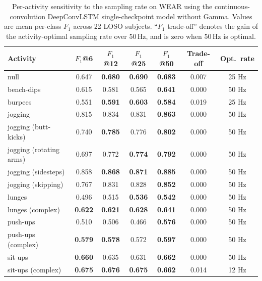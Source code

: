 \begin{table}[H]
  \centering
  \caption{Per-activity sensitivity to the sampling rate on WEAR using the continuous-convolution DeepConvLSTM single-checkpoint model without Gamma. Values are mean per-class $F_1$ across 22 LOSO subjects. ``$F_1$ trade-off'' denotes the gain of the activity-optimal sampling rate over $50$\,Hz, and is zero when $50$\,Hz is optimal.}
  \label{tab:freq_perclass_wear_continuous_single_nogamma}
  \begin{tabular}{lcccccc}
    \toprule
    Activity & $F_1$@6 & $F_1$@12 & $F_1$@25 & $F_1$@50 & Trade-off & Opt.\ rate \\
    \midrule
    null                           & 0.647 & \textbf{0.680} & \textbf{0.690} & \textbf{0.683} & 0.007 & 25 Hz \\
    bench-dips                     & 0.615 & 0.581 & 0.565 & \textbf{0.641} & 0.000 & 50 Hz \\
    burpees                        & 0.551 & \textbf{0.591} & \textbf{0.603} & \textbf{0.584} & 0.019 & 25 Hz \\
    jogging                        & 0.815 & 0.834 & 0.831 & \textbf{0.863} & 0.000 & 50 Hz \\
    jogging (butt-kicks)           & 0.740 & \textbf{0.785} & 0.776 & \textbf{0.802} & 0.000 & 50 Hz \\
    jogging (rotating arms)        & 0.697 & 0.772 & \textbf{0.774} & \textbf{0.792} & 0.000 & 50 Hz \\
    jogging (sidesteps)            & 0.858 & \textbf{0.868} & \textbf{0.871} & \textbf{0.885} & 0.000 & 50 Hz \\
    jogging (skipping)             & 0.767 & 0.831 & 0.828 & \textbf{0.852} & 0.000 & 50 Hz \\
    lunges                         & 0.496 & 0.515 & \textbf{0.536} & \textbf{0.542} & 0.000 & 50 Hz \\
    lunges (complex)               & \textbf{0.622} & \textbf{0.621} & \textbf{0.628} & \textbf{0.641} & 0.000 & 50 Hz \\
    push-ups                       & 0.510 & 0.506 & 0.466 & \textbf{0.576} & 0.000 & 50 Hz \\
    push-ups (complex)             & \textbf{0.579} & \textbf{0.578} & 0.572 & \textbf{0.597} & 0.000 & 50 Hz \\
    sit-ups                        & \textbf{0.660} & 0.635 & 0.631 & \textbf{0.662} & 0.000 & 50 Hz \\
    sit-ups (complex)              & \textbf{0.675} & \textbf{0.676} & \textbf{0.675} & \textbf{0.662} & 0.014 & 12 Hz \\

\end{tabular}
\end{table}
